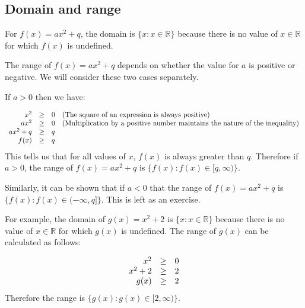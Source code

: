 \subsection*{Domain and range}
\nopagebreak
For $f(x)=a{x}^{2}+q$, the domain is $\{x:x\in \mathbb{R}\}$ because there is no value of $x\in \mathbb{R}$ for which $f(x)$ is undefined.\par 
The range of $f(x)=a{x}^{2}+q$ depends on whether the value for $a$ is positive or negative. We will consider these two cases separately.\par 
If $a>0$ then we have:\par 
\nopagebreak\noindent{}
\begin{equation*}
\begin{array}{cccc}\hfill {x}^{2}& \ge & 0\hfill & (\mbox{The square of an expression is always positive})\hfill \\ \hfill a{x}^{2}& \ge & 0\hfill & (\mbox{Multiplication by a positive number maintains the nature of the inequality})\hfill \\ \hfill a{x}^{2}+q& \ge & q\hfill & \\ \hfill f(x)& \ge & q\hfill & \end{array}
\end{equation*}
This tells us that for all values of $x$, $f(x)$ is always greater than $q$. Therefore if $a>0$, the range of $f(x)=a{x}^{2}+q$ is $\{f(x):f(x)\in [q,\infty )\}$.\par 
Similarly, it can be shown that if $a<0$ that the range of $f(x)=a{x}^{2}+q$ is $\{f(x):f(x)\in (-\infty ,q]\}$. This is left as an exercise.\par 
For example, the domain of $g(x)={x}^{2}+2$ is $\{x:x\in \mathbb{R}\}$ because there is no value of $x\in \mathbb{R}$ for which $g(x)$ is undefined. The range of $g(x)$ can be calculated as follows:\par 
\nopagebreak\noindent{}
\begin{equation*}
\begin{array}{ccc}\hfill {x}^{2}& \ge & 0\hfill \\ \hfill {x}^{2}+2& \ge & 2\hfill \\ \hfill g(x)& \ge & 2\hfill \end{array}
\end{equation*}
Therefore the range is $\{g(x):g(x)\in [2,\infty )\}$.\par 

